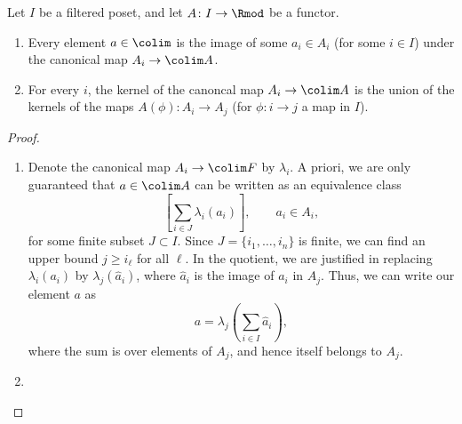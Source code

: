 \documentclass[main.tex]{subfiles}
\begin{document}
\begin{lemma}
  \label{lemma:properties_of_filtered_colimit}
  Let $I$ be a filtered poset, and let $A\colon I \to \Rmod$ be a functor.
  \begin{enumerate}
    \item Every element $a \in \colim$ is the image of some $a_{i} \in A_{i}$ (for some $i \in I$) under the canonical map $A_{i} \to \colim A$.

    \item For every $i$, the kernel of the canoncal map $A_{i} \to \colim A$ is the union of the kernels of the maps $A(\phi)\colon A_{i} \to A_{j}$ (for $\phi\colon i \to j$ a map in $I$).
  \end{enumerate}
\end{lemma}
\begin{proof}
  \leavevmode
  \begin{enumerate}
    \item Denote the canonical map \(A_{i} \to \colim F\) by \(\lambda_{i}\). A priori, we are only guaranteed that $a \in \colim A$ can be written as an equivalence class
      \begin{equation*}
        \left[ \sum_{i \in J} \lambda_{i}(a_{i}) \right],\qquad a_{i} \in A_{i},
      \end{equation*}
      for some finite subset $J \subset I$. Since $J = \{i_{1}, \ldots, i_{n}\}$ is finite, we can find an upper bound $j \geq i_{\ell}$ for all $\ell$. In the quotient, we are justified in replacing \(\lambda_{i}(a_{i})\) by \(\lambda_{j}(\hat{a}_{i})\), where \(\hat{a}_{i}\) is the image of \(a_{i}\) in \(A_{j}\). Thus, we can write our element \(a\) as
      \begin{equation*}
        a = \lambda_{j}\left(\sum_{i \in I}\hat{a}_{i}\right),
      \end{equation*}
      where the sum is over elements of \(A_{j}\), and hence itself belongs to \(A_{j}\).

    \item
  \end{enumerate}
\end{proof}
\end{document}
